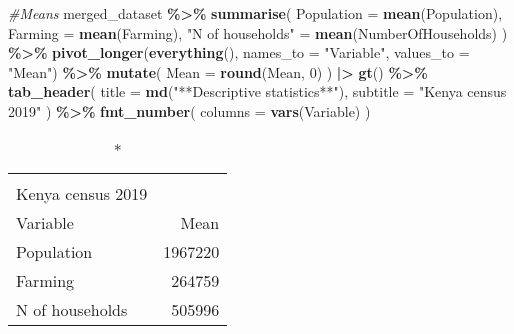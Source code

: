 \documentclass[
]{article}
\newenvironment{Shaded}{\begin{snugshade}}{\end{snugshade}}
\newcommand{\AttributeTok}[1]{\textcolor[rgb]{0.13,0.29,0.53}{#1}}
\newcommand{\CommentTok}[1]{\textcolor[rgb]{0.56,0.35,0.01}{\textit{#1}}}
\newcommand{\DecValTok}[1]{\textcolor[rgb]{0.00,0.00,0.81}{#1}}
\newcommand{\FunctionTok}[1]{\textcolor[rgb]{0.13,0.29,0.53}{\textbf{#1}}}
\newcommand{\NormalTok}[1]{#1}
\newcommand{\OtherTok}[1]{\textcolor[rgb]{0.56,0.35,0.01}{#1}}
\newcommand{\SpecialCharTok}[1]{\textcolor[rgb]{0.81,0.36,0.00}{\textbf{#1}}}
\newcommand{\StringTok}[1]{\textcolor[rgb]{0.31,0.60,0.02}{#1}}
\begin{document}
\begin{Shaded}
\begin{Highlighting}[]
\CommentTok{\#Means}
\NormalTok{merged\_dataset }\SpecialCharTok{\%\textgreater{}\%}
  \FunctionTok{summarise}\NormalTok{(}
    \AttributeTok{Population =} \FunctionTok{mean}\NormalTok{(Population),}
    \AttributeTok{Farming =} \FunctionTok{mean}\NormalTok{(Farming),}
    \StringTok{"N of households"} \OtherTok{=} \FunctionTok{mean}\NormalTok{(NumberOfHouseholds)}
\NormalTok{  ) }\SpecialCharTok{\%\textgreater{}\%}
  \FunctionTok{pivot\_longer}\NormalTok{(}\FunctionTok{everything}\NormalTok{(), }\AttributeTok{names\_to =} \StringTok{"Variable"}\NormalTok{, }\AttributeTok{values\_to =} \StringTok{"Mean"}\NormalTok{) }\SpecialCharTok{\%\textgreater{}\%}
  \FunctionTok{mutate}\NormalTok{(}
    \AttributeTok{Mean =} \FunctionTok{round}\NormalTok{(Mean, }\DecValTok{0}\NormalTok{)}
\NormalTok{  ) }\SpecialCharTok{|\textgreater{}} 
  \FunctionTok{gt}\NormalTok{() }\SpecialCharTok{\%\textgreater{}\%}
  \FunctionTok{tab\_header}\NormalTok{(}
    \AttributeTok{title =} \FunctionTok{md}\NormalTok{(}\StringTok{"**Descriptive statistics**"}\NormalTok{),}
    \AttributeTok{subtitle =} \StringTok{"Kenya census 2019"}
\NormalTok{  ) }\SpecialCharTok{\%\textgreater{}\%}
  \FunctionTok{fmt\_number}\NormalTok{(}
    \AttributeTok{columns =} \FunctionTok{vars}\NormalTok{(Variable)}
\NormalTok{  )}
\end{Highlighting}
\end{Shaded}

\begin{longtable}{lr}
\caption*{
{\large \textbf{Descriptive statistics}} \\ 
{\small Kenya census 2019}
} \\ 
\toprule
Variable & Mean \\ 
\midrule\addlinespace[2.5pt]
Population & 1967220 \\ 
Farming & 264759 \\ 
N of households & 505996 \\ 
\bottomrule
\end{longtable}
\end{document}
